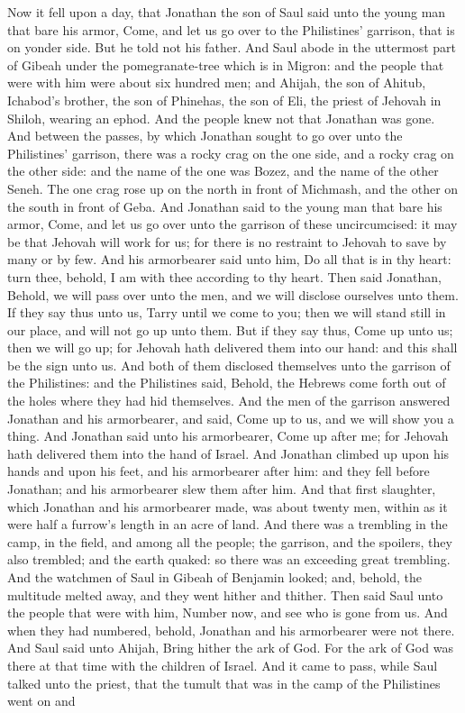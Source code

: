 Now it fell upon a day, that Jonathan the son of Saul said unto the young man that bare his armor, Come, and let us go over to the Philistines’ garrison, that is on yonder side. But he told not his father. And Saul abode in the uttermost part of Gibeah under the pomegranate-tree which is in Migron: and the people that were with him were about six hundred men; and Ahijah, the son of Ahitub, Ichabod’s brother, the son of Phinehas, the son of Eli, the priest of Jehovah in Shiloh, wearing an ephod. And the people knew not that Jonathan was gone. And between the passes, by which Jonathan sought to go over unto the Philistines’ garrison, there was a rocky crag on the one side, and a rocky crag on the other side: and the name of the one was Bozez, and the name of the other Seneh. The one crag rose up on the north in front of Michmash, and the other on the south in front of Geba.  And Jonathan said to the young man that bare his armor, Come, and let us go over unto the garrison of these uncircumcised: it may be that Jehovah will work for us; for there is no restraint to Jehovah to save by many or by few. And his armorbearer said unto him, Do all that is in thy heart: turn thee, behold, I am with thee according to thy heart. Then said Jonathan, Behold, we will pass over unto the men, and we will disclose ourselves unto them. If they say thus unto us, Tarry until we come to you; then we will stand still in our place, and will not go up unto them. But if they say thus, Come up unto us; then we will go up; for Jehovah hath delivered them into our hand: and this shall be the sign unto us. And both of them disclosed themselves unto the garrison of the Philistines: and the Philistines said, Behold, the Hebrews come forth out of the holes where they had hid themselves. And the men of the garrison answered Jonathan and his armorbearer, and said, Come up to us, and we will show you a thing. And Jonathan said unto his armorbearer, Come up after me; for Jehovah hath delivered them into the hand of Israel. And Jonathan climbed up upon his hands and upon his feet, and his armorbearer after him: and they fell before Jonathan; and his armorbearer slew them after him. And that first slaughter, which Jonathan and his armorbearer made, was about twenty men, within as it were half a furrow’s length in an acre of land. And there was a trembling in the camp, in the field, and among all the people; the garrison, and the spoilers, they also trembled; and the earth quaked: so there was an exceeding great trembling.  And the watchmen of Saul in Gibeah of Benjamin looked; and, behold, the multitude melted away, and they went hither and thither. Then said Saul unto the people that were with him, Number now, and see who is gone from us. And when they had numbered, behold, Jonathan and his armorbearer were not there. And Saul said unto Ahijah, Bring hither the ark of God. For the ark of God was there at that time with the children of Israel. And it came to pass, while Saul talked unto the priest, that the tumult that was in the camp of the Philistines went on and 